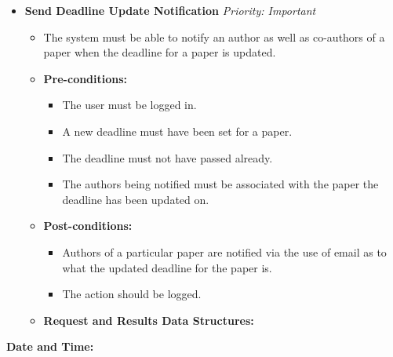 \documentclass{article}
\begin{document}
\begin{itemize}
					\item \textbf{Send Deadline Update Notification} \hfill \textit{Priority: Important}
					\begin{itemize}
						\item The system must be able to notify an author as well as co-authors of a paper when the deadline for a paper is updated.
						\item \textbf{Pre-conditions:}
						\begin{itemize}
							\item The user must be logged in.
							\item A new deadline must have been set for a paper.
							\item The deadline must not have passed already.
							\item The authors being notified must be associated with the paper the deadline has been updated on.
						\end{itemize}
						\item \textbf{Post-conditions:}
						\begin{itemize}
							\item Authors of a particular paper are notified via the use of email as to what the updated deadline for the paper is.
							\item The action should be logged.
						\end{itemize}
						\item \textbf{Request and Results Data Structures:}
					\end{itemize}						
				\end{itemize}
				\textbf{\large{Date and Time:}}
\end{document}
